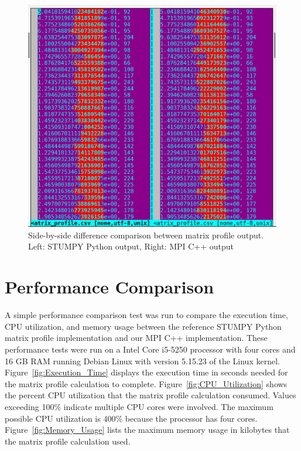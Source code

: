 \documentclass[conference]{IEEEtran}
\begin{document}
\begin{figure}
\begin{center}
\includegraphics[scale=0.42]{matrix_profile_diff.png}
\caption{Side-by-side difference comparison between matrix profile output.   Left: STUMPY Python output, Right: MPI C++ output}
\label{fig:Matrix_Profile_Diff}
\end{center}
\end{figure}

\section{Performance Comparison}

A simple performance comparison test was run to compare the execution time, CPU utilization, and memory usage between the reference STUMPY Python matrix profile implementation and our MPI C++ implementation.  These performance tests were run on a Intel Core i5-5250 processor with four cores and 16 GB RAM running Debian Linux with version 5.15.23 of the Linux kernel.  Figure~\ref{fig:Execution_Time} displays the execution time in seconds needed for the matrix profile calculation to complete. Figure~\ref{fig:CPU_Utilization} shows the percent CPU utilization that the matrix profile calculation consumed.  Values exceeding 100\% indicate multiple CPU cores were involved.  The maximum possible CPU utilization is 400\% because the processor has four cores. Figure~\ref{fig:Memory_Usage} lists the maximum memory usage in kilobytes that the matrix profile calculation used. 
\end{document}
